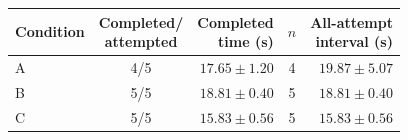 \begin{tabular}{lcrcr}
\toprule
Condition & \makecell{Completed/\\attempted} & \makecell{Completed\\time (s)} & $n$ & \makecell{All-attempt\\interval (s)} \\
\midrule
A & 4/5 & $17.65 \pm 1.20$ & 4 & $19.87 \pm 5.07$ \\
B & 5/5 & $18.81 \pm 0.40$ & 5 & $18.81 \pm 0.40$ \\
C & 5/5 & $15.83 \pm 0.56$ & 5 & $15.83 \pm 0.56$ \\
\bottomrule
\end{tabular}
